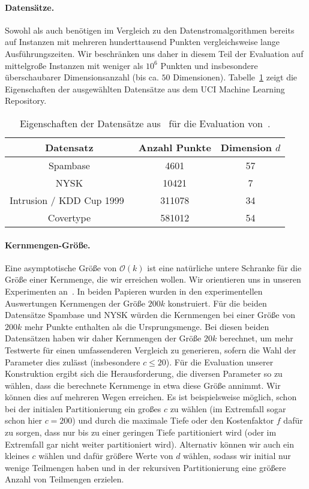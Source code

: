 \paragraph{Datensätze.} Sowohl \kmpp{} als auch \CsTwo{} benötigen im Vergleich zu den Datenstromalgorithmen bereits auf Instanzen
mit mehreren hunderttausend Punkten vergleichsweise lange Ausführungszeiten. Wir beschränken uns daher in diesem Teil der
Evaluation auf mittelgroße Instanzen mit weniger als $10^6$ Punkten und insbesondere überschaubarer Dimensionsanzahl (bis
ca. $50$ Dimensionen). Tabelle~\ref{tbl:experiment-coresets-datasets} zeigt die Eigenschaften der ausgewählten Datensätze aus dem
UCI Machine Learning Repository.

\begin{table}[t]
\centering
\begin{tabular}{@{}ccc@{}} \toprule
	\textbf{Datensatz} & \textbf{Anzahl Punkte} & \textbf{Dimension} $d$ \\ \midrule
	Spambase & 4601 & 57 \\
	NYSK & 10421  & 7 \\
	Intrusion / KDD Cup 1999~\cite{AckermannMRSLS12} & 311078 & 34 \\
	Covertype & 581012 & 54 \\ \bottomrule
\end{tabular}
\caption{Eigenschaften der Datensätze aus~\cite{Lichman13} für die Evaluation von~\CsTwo.}
\label{tbl:experiment-coresets-datasets}
\end{table}

\paragraph{Kernmengen-Größe.}
Eine asymptotische Größe von $\mathcal{O}(k)$ ist eine natürliche untere Schranke für die Größe einer Kernmenge, die wir
erreichen wollen. Wir orientieren uns in unseren Experimenten an~\cite{AckermannMRSLS12,FichtenbergerGSSS13}. In beiden Papieren
wurden in den experimentellen Auswertungen Kernmengen der Größe $200k$ konstruiert. Für die beiden Datensätze Spambase und
NYSK würden die Kernmengen bei einer Größe von $200k$ mehr Punkte enthalten als die Ursprungsmenge. Bei diesen beiden Datensätzen
haben wir daher Kernmengen der Größe $20k$ berechnet, um mehr Testwerte für einen umfassenderen Vergleich zu generieren, sofern
die Wahl der Parameter dies zulässt (insbesondere $c \leq 20$).
Für die Evaluation unserer Konstruktion ergibt sich die Herausforderung, die diversen Parameter so zu wählen, dass die
berechnete Kernmenge in etwa diese Größe annimmt. Wir können dies auf mehreren Wegen erreichen. Es ist beispielsweise möglich,
schon bei der initialen Partitionierung ein großes $c$ zu wählen (im Extremfall sogar schon hier $c=200$) und durch die maximale
Tiefe oder den Kostenfaktor $f$ dafür zu sorgen, dass nur bis zu einer geringen Tiefe partitioniert wird (oder im Extremfall
gar nicht weiter partitioniert wird). Alternativ können wir auch ein kleines $c$ wählen und dafür größere
Werte von $d$ wählen, sodass wir initial nur wenige Teilmengen haben und in der rekursiven Partitionierung eine größere
Anzahl von Teilmengen erzielen.

